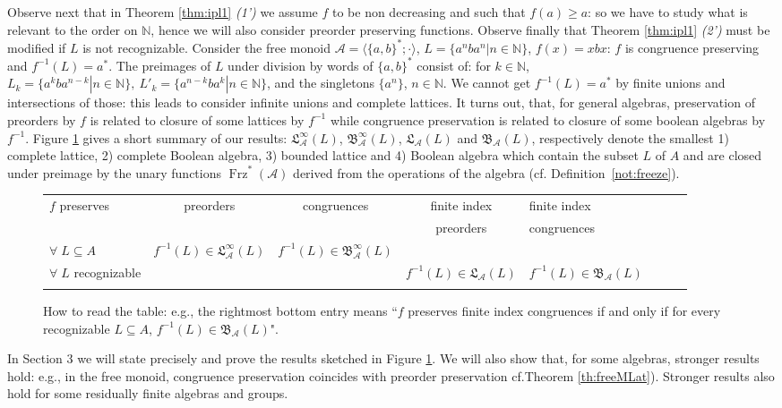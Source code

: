 \documentclass[11pt,a4paper]{article}
\theoremstyle{definition} %
\newcommand\+[1]{\mathcal{#1}} %
\newcommand{\N}{{\mathbb N}}     %
\newcommand{\Bool}{{\mathfrak{B}}}   %
\newcommand{\Latt}{{\mathfrak{L}}}
\DeclareMathOperator{\freez}{Frz}%
\begin{document}
Observe next that in Theorem  \ref{thm:ipl1} {\it (1')} we assume $f$ to be non decreasing and such that $f(a)\geq a$: so we have to study what is relevant to the order on $\N$, hence we will also consider  preorder preserving functions.
Observe finally that Theorem \ref{thm:ipl1} {\it (2')} must be modified if  $L$ is not recognizable. Consider the free monoid  $\+A=\langle \{a,b\}^*;\cdot\rangle$, $L=\{a^nba^n|n\in\N\}$, $f(x)=xbx$: $f$ is congruence preserving and $f^{-1}(L)=a^*$.  The  preimages of $L$ under division by words of $\{a,b\}^*$ consist of:  for $k\in\N$, $L_k=\{ a^kb a^{n-k}|n\in\N\}, \  L'_k=\{ a^{n-k}b a^k|n\in\N\}$,  and the singletons $\{a^n\}$,  $n\in\N$.  We cannot get $f^{-1}(L)=a^*$
 by finite unions and intersections of those: this leads to consider infinite unions and complete lattices. 
It turns out, that, for general algebras, preservation of preorders by $f$ is related to closure of some lattices by $f^{-1}$ while congruence preservation is related to closure of some boolean algebras by $f^{-1}$.  Figure \ref{fig:resume} gives a short summary of our results:  $\Latt_{\+A}^\infty(L)$, $\Bool_{\+A}^\infty(L)$, 
$\Latt_{\+A}(L)$ and  $\Bool_{\+A}(L)$,
respectively  denote 
 the smallest 1) complete lattice, 2) complete Boolean algebra, 
3) bounded lattice  and 
4)  Boolean algebra 
which
contain the subset $L$ of $A$
and are closed under preimage 
 by the unary functions $\freez^{*}(\+A)$ derived from the operations of the algebra (cf. Definition~\ref{not:freeze}).

 \begin{figure}[h]
 {\scriptsize
 \begin{tabular}{Ic|c|cIc|cI}
 \Xhline{1pt}
 $f$  preserves  &preorders&congruences&finite index&finite index\\
 &&&preorders&congruences\\
 \Xhline{1pt}
 $ \forall\;L\subseteq A$&$f^{-1}(L)\in\Latt_{\+A}^\infty(L)$&  $f^{-1}(L)\in\Bool_{\+A}^\infty(L)$&&\\
 \hline
$ \forall\;L$ recognizable&&&$f^{-1}(L)\in\Latt_{\+A}(L)$&  $f^{-1}(L)\in\Bool_{\+A}(L)$\\
 \Xhline{1pt}
 \end{tabular}
 }
 \caption{\small How to read  the  table: e.g., the rightmost bottom entry means ``$f$ preserves finite index congruences if and only if for every recognizable $L\subseteq A$, $f^{-1}(L)\in\Bool_{\+A}(L)$".}\label{fig:resume}
\end{figure}


In Section 3 we will  state precisely and prove the results sketched in 
Figure \ref{fig:resume}. We will also show that, for some algebras, stronger results hold: e.g., in the free monoid,  congruence preservation coincides with preorder preservation cf.Theorem \ref{th:freeMLat}).  %
 Stronger results also hold for some residually finite algebras and groups.
 
\end{document}
